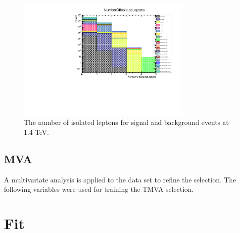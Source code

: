 \begin{figure}
\centering
\includegraphics[width=0.75\textwidth]{PhysicsAnalysis/Plots/PreSelection/NumberOfIsolatedLeptons.pdf}
\caption[Number of isolated leptons at 1.4 TeV.]{The number of isolated leptons for signal and background events at 1.4 TeV.}
\label{fig:preselection3}
\end{figure}

\subsection{MVA}
A multivariate analysis is applied to the data set to refine the selection. The following variables were used for training the TMVA selection.

\section{Fit}

